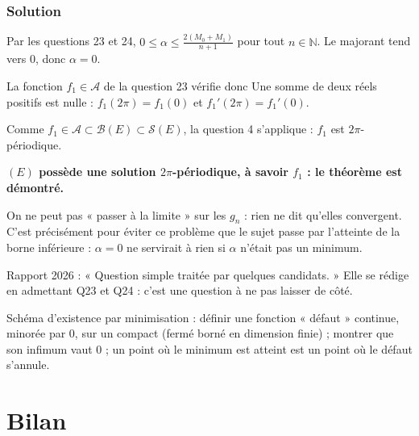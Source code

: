 \documentclass[11pt,a4paper]{article}
\newcommand{\equationajustee}[1]{%
  \sbox{\boiteequation}{$\displaystyle #1$}%
  \ifdim\wd\boiteequation>\linewidth
    \[\resizebox{\linewidth}{!}{\usebox{\boiteequation}}\]%
  \else
    \[#1\]%
  \fi}
\begin{document}
\hypertarget{solution-24}{%
\subsubsection{Solution}\label{solution-24}}

Par les questions 23 et 24, \(0\le\alpha\le\frac{2(M_0+M_1)}{n+1}\) pour tout \(n\in\mathbb N\). Le majorant tend vers \(0\), donc \(\alpha=0\).

La fonction \(f_1\in\mathcal A\) de la question 23 vérifie donc
\equationajustee{|f_1(2\pi)-f_1(0)|+|f_1'(2\pi)-f_1'(0)|=0.}
Une somme de deux réels positifs est nulle : \(f_1(2\pi)=f_1(0)\) et \(f_1'(2\pi)=f_1'(0)\).

Comme \(f_1\in\mathcal A\subset\mathcal B(E)\subset\mathcal S(E)\), la question 4 s'applique : \(f_1\) est \(2\pi\)-périodique.

\textbf{\((E)\) possède une solution \(2\pi\)-périodique, à savoir \(f_1\) : le théorème est démontré.}

\begin{piege}

On ne peut pas « passer à la limite » sur les \(g_n\) : rien ne dit qu'elles convergent. C'est précisément pour éviter ce problème que le sujet passe par l'atteinte de la borne inférieure : \(\alpha=0\) ne servirait à rien si \(\alpha\) n'était pas un minimum.

\end{piege}

\begin{jury}

Rapport 2026 : « Question simple traitée par quelques candidats. » Elle se rédige en admettant Q23 et Q24 : c'est une question à ne pas laisser de côté.

\end{jury}

\begin{methode}

Schéma d'existence par minimisation : définir une fonction « défaut » continue, minorée par \(0\), sur un compact (fermé borné en dimension finie) ; montrer que son infimum vaut \(0\) ; un point où le minimum est atteint est un point où le défaut s'annule.

\end{methode}

\hypertarget{bilan}{%
\section{Bilan}\label{bilan}}
\end{document}
